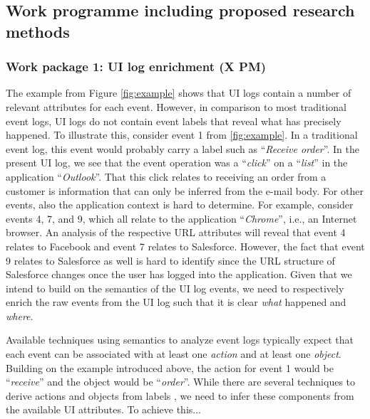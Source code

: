 \subsection{Work programme including proposed research methods}


\subsubsection{Work package 1: UI log enrichment (X PM)}
\label{sec:wp1}

The example from Figure \ref{fig:example} shows that UI logs contain a number of relevant attributes for each event. However, in comparison to most traditional event logs, UI logs do not contain event labels that reveal what has precisely happened. To illustrate this, consider event 1 from \autoref{fig:example}. In a traditional event log, this event would probably carry a label such as ``\textit{Receive order}''. In the present UI log, we see that the event operation was a ``\textit{click}'' on a ``\textit{list}'' in the application ``\textit{Outlook}''. That this click relates to receiving an order from a customer is information that can only be inferred from the e-mail body. For other events, also the application context is hard to determine. For example, consider events 4, 7, and 9, which all relate to the application ``\textit{Chrome}'', i.e., an Internet browser. An analysis of the respective URL attributes will reveal that event 4 relates to Facebook and event 7 relates to Salesforce. However, the fact that event 9 relates to Salesforce as well is hard to identify since the URL structure of Salesforce changes once the user has logged into the application. Given that we intend to build on the semantics of the UI log events, we need to respectively enrich the raw events from the UI log such that it is clear \textit{what} happened and \textit{where}. 

 Available techniques using semantics to analyze event logs \cite{} typically expect that each event can be associated with at least one \textit{action} and at least one \textit{object}. Building on the example introduced above, the action for event 1 would be ``\textit{receive}'' and the object would be ``\textit{order}''. While there are several techniques to derive actions and objects from labels \cite{}, we need to infer these components from the available UI attributes. To achieve this... 


